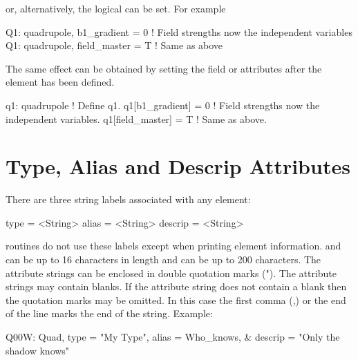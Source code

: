 or, alternatively, the  logical can be set. For
example
\begin{example}
  Q1: quadrupole, b1_gradient = 0   ! Field strengths now the independent variables
  Q1: quadrupole, field_master = T  ! Same as above
\end{example}
The same effect can be obtained by setting the field or  attributes
after the element has been defined.
\begin{example}
  q1: quadrupole        ! Define q1.
  q1[b1_gradient] = 0   ! Field strengths now the independent variables.
  q1[field_master] = T  ! Same as above.
\end{example}

\section{Type, Alias and Descrip Attributes}
\label{s:string}

There are three string labels associated with any element:
\begin{example}
  type    = <String>
  alias   = <String>
  descrip = <String>
\end{example}
\bmad routines do not use these labels except when printing element
information.  and  can be up to 16 characters in
length and  can be up to 200 characters. The attribute
strings can be enclosed in double quotation marks ("). The attribute
strings may contain blanks. If the attribute string does not contain a
blank then the quotation marks may be omitted. In this case the first
comma (,) or the end of the line marks the end of the string. Example:
\begin{example}
  Q00W: Quad, type = "My Type", alias = Who_knows, &
                                  descrip = "Only the shadow knows"
\end{example}


